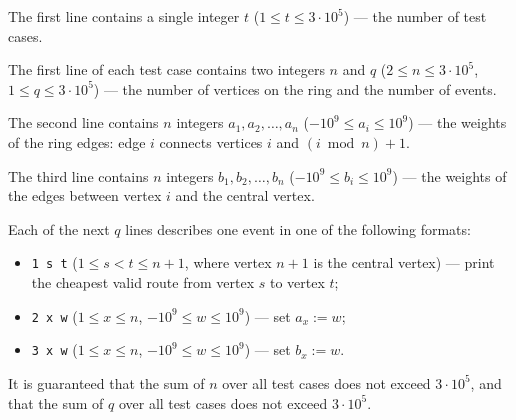 The first line contains a single integer $t$ ($1 \le t \le 3 \cdot 10^5$) --- the number of test cases.

The first line of each test case contains two integers $n$ and $q$ ($2 \le n \le 3 \cdot 10^5$, $1 \le q \le 3 \cdot 10^5$) --- the number of vertices on the ring and the number of events.

The second line contains $n$ integers $a_1, a_2, \ldots, a_n$ ($-10^9 \le a_i \le 10^9$) --- the weights of the ring edges: edge $i$ connects vertices $i$ and $(i \bmod n) + 1$.

The third line contains $n$ integers $b_1, b_2, \ldots, b_n$ ($-10^9 \le b_i \le 10^9$) --- the weights of the edges between vertex $i$ and the central vertex.

Each of the next $q$ lines describes one event in one of the following formats:
\begin{itemize}
\item \texttt{1 s t} ($1 \le s < t \le n+1$, where vertex $n+1$ is the central vertex) --- print the cheapest valid route from vertex $s$ to vertex $t$;
\item \texttt{2 x w} ($1 \le x \le n$, $-10^9 \le w \le 10^9$) --- set $a_x := w$;
\item \texttt{3 x w} ($1 \le x \le n$, $-10^9 \le w \le 10^9$) --- set $b_x := w$.
\end{itemize}

It is guaranteed that the sum of $n$ over all test cases does not exceed $3 \cdot 10^5$, and that the sum of $q$ over all test cases does not exceed $3 \cdot 10^5$.
